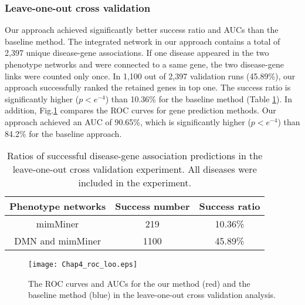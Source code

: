 \subsubsection{Leave-one-out cross validation}
Our approach achieved significantly better success ratio and AUCs than the baseline method.
The integrated network in our approach contains a total of 2,397 unique
disease-gene associations. If one disease appeared in the two phenotype
networks and were connected to a same gene, the two disease-gene links
were counted only once. In 1,100 out of 2,397 validation runs (45.89\%),
our approach successfully ranked the retained genes in top one.
The success ratio is significantly higher ($p<e^{-4}$) than 10.36\%
for the baseline method (Table \ref{looratio}).
In addition, Fig.\ref{roc_loo} compares the ROC curves for gene prediction methods.
Our approach achieved an AUC of 90.65\%, which is significantly higher ($p<e^{-4}$) than
84.2\% for the baseline approach.
\begin{table}[!t]
\caption{Ratios of successful disease-gene association predictions in the leave-one-out cross validation experiment. All diseases were included in the experiment.}
\label{looratio}
\centering
\begin{tabular}{ccc}
\hline
Phenotype networks & Success number & Success ratio\\
\hline
mimMiner & 219 & 10.36\%\\
\hline
DMN and mimMiner & 1100 &45.89\%\\
\hline
\end{tabular}
\end{table}


\begin{figure}[!tpb]
\vspace{0cm}
\centerline{\texttt{[image: Chap4\_roc\_loo.eps]}}
\vspace{0cm}
\caption{The ROC curves and AUCs for the our method (red) and the baseline method (blue) in the leave-one-out cross validation analysis.}
\vspace{-.5cm}
\label{roc_loo}
\end{figure}

